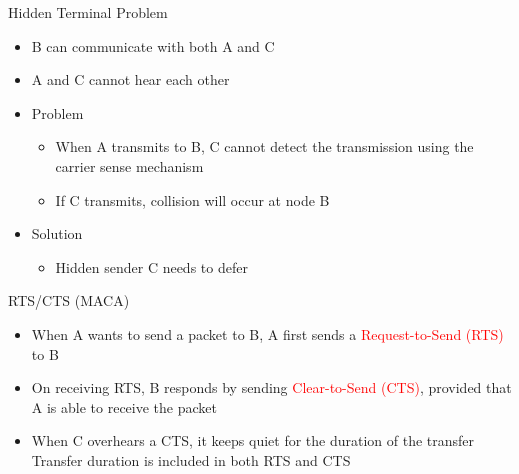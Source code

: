 \documentclass[pdf]{beamer}
\begin{document}
\begin{frame}{Hidden Terminal Problem}

  \begin{itemize}
  \item  B can communicate with both A and C  
  \item  A and C cannot hear each other
    \item Problem
      \begin{itemize}
      \item     When A transmits to B, C cannot detect the transmission
        using the carrier sense mechanism
      \item  If C transmits, collision will occur at node B    
      \end{itemize}
    \item Solution
      
      \begin{itemize}
      \item Hidden sender C needs to defer
      \end{itemize}
  \end{itemize}
\end{frame}

\begin{frame}{RTS/CTS (MACA)}

  \begin{itemize}
  \item When A wants to send a packet to B, A first sends a
   \textcolor{red}{ Request-to-Send (RTS)} to B
  \item On receiving RTS, B responds by sending \textcolor{red}{ Clear-to-Send (CTS)}, provided that A is able to receive the packet
  \item When C overhears a CTS, it keeps quiet for the
   duration of the transfer Transfer duration is included in both RTS and CTS
  \end{itemize}
\end{frame}
\end{document}
